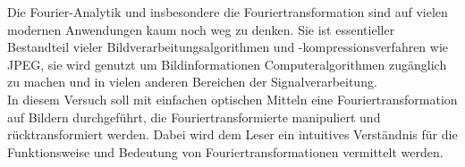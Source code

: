 
Die Fourier-Analytik und insbesondere die Fouriertransformation sind auf vielen modernen Anwendungen kaum noch weg zu denken. Sie ist essentieller Bestandteil vieler Bildverarbeitungsalgorithmen\cite{easton_fourier_2010} und -kompressionsverfahren wie JPEG\cite{_jpeg_2015}, sie wird genutzt um Bildinformationen Computeralgorithmen zugänglich zu machen\cite{prof._dr._norbert_link_vorlesungsscript:_????} und in vielen anderen Bereichen der Signalverarbeitung.\\

In diesem Versuch soll mit einfachen optischen Mitteln eine Fouriertransformation auf Bildern durchgeführt, die Fouriertransformierte manipuliert und rücktransformiert werden. Dabei wird dem Leser ein intuitives Verständnis für die Funktionsweise und Bedeutung von Fouriertransformationen vermittelt werden.